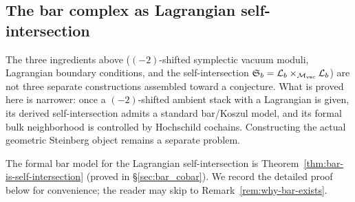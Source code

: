 \subsection{The bar complex as Lagrangian self-intersection}
\label{ssec:bar-as-self-intersection}

\providecommand{\Steinb}{\mathfrak{S}}
\providecommand{\BM}{\mathrm{BM}}

The three ingredients above ($(-2)$-shifted symplectic vacuum
moduli, Lagrangian boundary conditions, and the self-intersection
$\Steinb_b = \cL_b \times_{\cM_{\mathrm{vac}}} \cL_b$) are not
three separate constructions assembled toward a conjecture. What is
proved here is narrower: once a $(-2)$-shifted ambient stack with a
Lagrangian is given, its derived self-intersection admits a standard
bar/Koszul model, and its formal bulk neighborhood is controlled by
Hochschild cochains. Constructing the actual geometric Steinberg
object remains a separate problem.

\noindent
The formal bar model for the Lagrangian self-intersection is
Theorem~\ref{thm:bar-is-self-intersection} (proved in
\S\ref{sec:bar_cobar}). We record the detailed proof below for
convenience; the reader may skip to
Remark~\ref{rem:why-bar-exists}.

